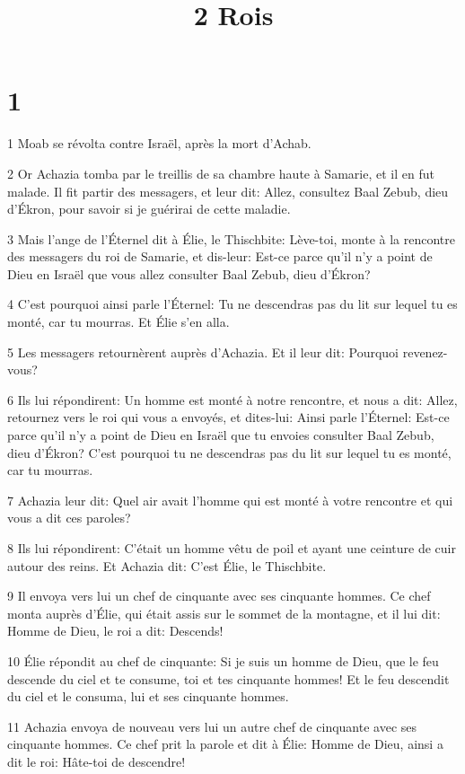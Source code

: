 

\title{2 Rois}


\chapter{1}

\par 1 Moab se révolta contre Israël, après la mort d'Achab.
\par 2 Or Achazia tomba par le treillis de sa chambre haute à Samarie, et il en fut malade. Il fit partir des messagers, et leur dit: Allez, consultez Baal Zebub, dieu d'Ékron, pour savoir si je guérirai de cette maladie.
\par 3 Mais l'ange de l'Éternel dit à Élie, le Thischbite: Lève-toi, monte à la rencontre des messagers du roi de Samarie, et dis-leur: Est-ce parce qu'il n'y a point de Dieu en Israël que vous allez consulter Baal Zebub, dieu d'Ékron?
\par 4 C'est pourquoi ainsi parle l'Éternel: Tu ne descendras pas du lit sur lequel tu es monté, car tu mourras. Et Élie s'en alla.
\par 5 Les messagers retournèrent auprès d'Achazia. Et il leur dit: Pourquoi revenez-vous?
\par 6 Ils lui répondirent: Un homme est monté à notre rencontre, et nous a dit: Allez, retournez vers le roi qui vous a envoyés, et dites-lui: Ainsi parle l'Éternel: Est-ce parce qu'il n'y a point de Dieu en Israël que tu envoies consulter Baal Zebub, dieu d'Ékron? C'est pourquoi tu ne descendras pas du lit sur lequel tu es monté, car tu mourras.
\par 7 Achazia leur dit: Quel air avait l'homme qui est monté à votre rencontre et qui vous a dit ces paroles?
\par 8 Ils lui répondirent: C'était un homme vêtu de poil et ayant une ceinture de cuir autour des reins. Et Achazia dit: C'est Élie, le Thischbite.
\par 9 Il envoya vers lui un chef de cinquante avec ses cinquante hommes. Ce chef monta auprès d'Élie, qui était assis sur le sommet de la montagne, et il lui dit: Homme de Dieu, le roi a dit: Descends!
\par 10 Élie répondit au chef de cinquante: Si je suis un homme de Dieu, que le feu descende du ciel et te consume, toi et tes cinquante hommes! Et le feu descendit du ciel et le consuma, lui et ses cinquante hommes.
\par 11 Achazia envoya de nouveau vers lui un autre chef de cinquante avec ses cinquante hommes. Ce chef prit la parole et dit à Élie: Homme de Dieu, ainsi a dit le roi: Hâte-toi de descendre!
